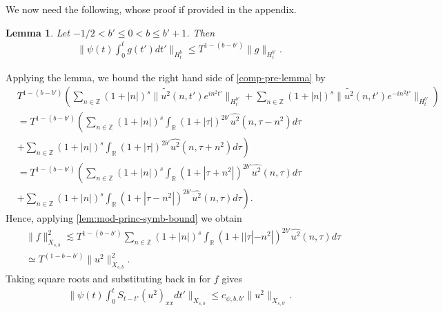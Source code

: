 \documentclass[12pt,reqno]{amsart}
\numberwithin{equation}{section}  %
\numberwithin{figure}{section}
\newcommand{\rr}{\mathbb{R}}
\newcommand{\zz}{\mathbb{Z}}
\newcommand{\wh}{\widehat}
\newcommand{\wt}{\widetilde}
\theoremstyle{plain}
\newtheorem{lemma}{Lemma}
\theoremstyle{definition}
\theoremstyle{remark}
\begin{document}
%
We now need the following, whose proof if provided in the appendix.
%
%
%
%
%
%
%
%
\begin{lemma}
Let $-1/2 < b' \le 0 < b \le b' + 1$. Then
%
%
\begin{equation*}
\begin{split}
  \| \psi(t) \int_{0}^{t} g(t') dt' \|_{H^{b}_{t}} \le T^{1-(b-b')} \| g
  \|_{H_{t}^{b'}}.
\end{split}
\end{equation*}
%
%
\label{lem:pre-bilin-est}
\end{lemma}
%
%
Applying the lemma, we bound the right hand side of \eqref{comp-pre-lemma} by
%
%
\begin{equation*}
\begin{split}
  & T^{1-(b - b')} \left( \sum_{n \in \zz} (1 + |n|)^{s} \| \wt{u^{2}}(n, t')
  e^{in^{2}t'} \|_{H_{t}^{b'}}  +
  \sum_{n \in \zz} (1 + |n|)^{s} \| \wt{u^{2}}(n, t')
  e^{-in^{2}t'} \|_{H_{t}^{b'}} \right)
  \\
  & = T^{1-(b -b')}\left( \sum_{n \in \zz} (1 + |n|)^{s} \int_{\rr} (1 + | \tau
  |)^{2b'} \wh{u^{2}}(n, \tau - n^{2}) d \tau \right. 
  \\
  & +
  \left . \sum_{n \in \zz} (1 + |n|)^{s} \int_{\rr} (1 + | \tau
  |)^{2b'} \wh{u^{2}}(n, \tau + n^{2}) d \tau  \right)
  \\
  & = T^{1-(b -b')}\left( \sum_{n \in \zz} (1 + |n|)^{s} \int_{\rr} (1 + | \tau
  + n^{2}
  |)^{2b'} \wh{u^{2}}(n, \tau ) d \tau \right .
  \\
  & +
  \left. \sum_{n \in \zz} (1 + |n|)^{s} \int_{\rr} (1 + | \tau
  - n^{2} |)^{2b'} \wh{u^{2}}(n, \tau) d \tau  \right).
\end{split}
\end{equation*}
%
%
Hence, applying \autoref{lem:mod-princ-symb-bound} we obtain
%
%
%
\begin{equation*}
\begin{split}
  & \| f \|_{X_{s,b}}^{2} \lesssim T^{1-(b - b')} 
  \sum_{n \in \zz} (1 + |n|)^{s} \int_{\rr} (1 + | |\tau|
  - n^{2} |)^{2b'} \wh{u^{2}}(n, \tau) d \tau  
  \\
  & \simeq T^{(1-b - b')} \|u^{2} \|_{X_{s,b}}^{2}.
\end{split}
\end{equation*}
%
%
Taking square roots and substituting back in for $f$ gives
%
%
\begin{equation}
\begin{split}
  \|\psi(t) \int_{0}^{t} S_{t-t'} (u^{2})_{xx} dt'\|_{X_{s,b}} \le c_{\psi, b,
  b'} \| u^{2} \|_{X_{s,b'}}.
\end{split}
\label{eqn:non-lin-bound}
\end{equation}
\end{document}
